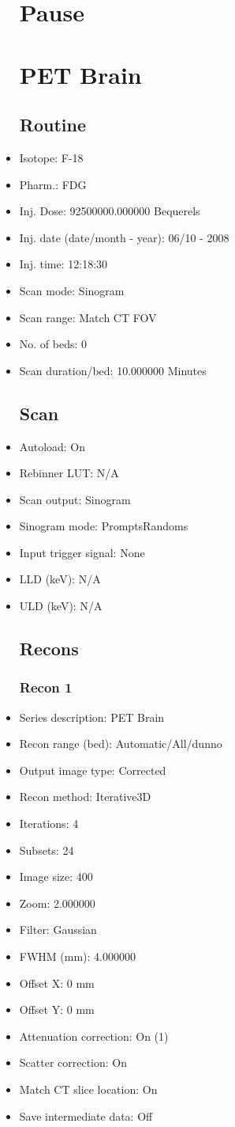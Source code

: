 \documentclass[12pt]{article}
\begin{document}
\begin{itemize}
\section{Pause}
\section{PET Brain}\subsection{Routine}
\item Isotope: F-18
\item Pharm.: FDG
\item Inj. Dose: 92500000.000000 Bequerels
\item Inj. date (date/month - year): 06/10 - 2008
\item Inj. time: 12:18:30
\item Scan mode: Sinogram
\item Scan range: Match CT FOV
\item No. of beds: 0
\item Scan duration/bed: 10.000000 Minutes
\subsection{Scan}
\item Autoload: On
\item Rebinner LUT: N/A
\item Scan output: Sinogram
\item Sinogram mode: PromptsRandoms
\item Input trigger signal: None
\item LLD (keV): N/A
\item ULD (keV): N/A
\subsection{Recons}
\subsubsection{Recon 1}
\item Series description: PET Brain
\item Recon range (bed): Automatic/All/dunno
\item Output image type: Corrected
\item Recon method: Iterative3D
\item Iterations: 4
\item Subsets: 24
\item Image size: 400
\item Zoom: 2.000000
\item Filter: Gaussian
\item FWHM (mm): 4.000000
\item Offset X: 0 mm
\item Offset Y: 0 mm
\item Attenuation correction: On (1)
\item Scatter correction: On
\item Match CT slice location: On
\item Save intermediate data: Off
\end{itemize}
\end{document}
